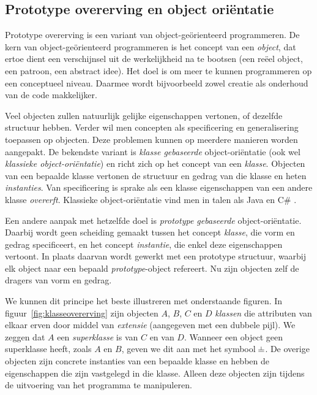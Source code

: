 \subsection{Prototype overerving en object oriëntatie}
\label{sec:taal-prototypen}

Prototype overerving is een variant van object-geörienteerd programmeren. De kern van object-geörienteerd programmeren is het concept van een \emph{object}, dat ertoe dient een verschijnsel uit de werkelijkheid na te bootsen (een reëel object, een patroon, een abstract idee). Het doel is om meer te kunnen programmeren op een conceptueel niveau. Daarmee wordt bijvoorbeeld zowel creatie als onderhoud van de code makkelijker.

Veel objecten zullen natuurlijk gelijke eigenschappen vertonen, of dezelfde structuur hebben. Verder wil men concepten als specificering en generalisering toepassen op objecten. Deze problemen kunnen op meerdere manieren worden aangepakt. De bekendste variant is \emph{klasse gebaseerde} object-oriëntatie (ook wel \emph{klassieke object-oriëntatie}) en richt zich op het concept van een \emph{klasse}. Objecten van een bepaalde klasse vertonen de structuur en gedrag van die klasse en heten \emph{instanties}. Van specificering is sprake als een klasse eigenschappen van een andere klasse \emph{overerft}. Klassieke object-oriëntatie vind men in talen als Java en C\# \citep{java,csharp}.

Een andere aanpak met hetzelfde doel is \emph{prototype gebaseerde} object-oriëntatie. Daarbij wordt geen scheiding gemaakt tussen het concept \emph{klasse}, die vorm en gedrag specificeert, en het concept \emph{instantie}, die enkel deze eigenschappen vertoont. In plaats daarvan wordt gewerkt met een prototype structuur, waarbij elk object naar een bepaald \emph{prototype}-object refereert. Nu zijn objecten zelf de dragers van vorm en gedrag.

We kunnen dit principe het beste illustreren met onderstaande figuren. In figuur~\ref{fig:klasseovererving} zijn objecten $A$, $B$, $C$ en $D$ \emph{klassen} die attributen van elkaar erven door middel van \emph{extensie} (aangegeven met een dubbele pijl). We zeggen dat $A$ een \emph{superklasse} is van $C$ en van $D$. Wanneer een object geen superklasse heeft, zoals $A$ en $B$, geven we dit aan met het symbool $\nil$. De overige objecten zijn concrete instanties van een bepaalde klasse en hebben de eigenschappen die zijn vastgelegd in die klasse. Alleen deze objecten zijn tijdens de uitvoering van het programma te manipuleren.

